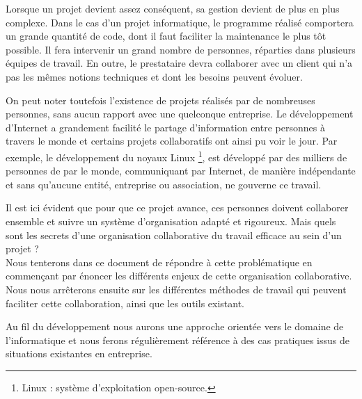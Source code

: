 
Lorsque un projet devient assez conséquent, sa gestion devient de plus en plus complexe. Dans le cas d'un projet informatique, le programme réalisé comportera un grande quantité de code, dont il faut faciliter la maintenance le plus tôt possible. Il fera intervenir un grand nombre de personnes, réparties dans plusieurs équipes de travail. En outre, le prestataire devra collaborer avec un client qui n'a pas les mêmes notions techniques et dont les besoins peuvent évoluer.

On peut noter toutefois l'existence de projets réalisés par de nombreuses personnes, sans aucun rapport avec une quelconque entreprise. Le développement d'Internet a grandement facilité le partage d'information entre personnes à travers le monde et certains projets collaboratifs ont ainsi pu voir le jour. Par exemple, le développement du noyaux Linux \footnote{Linux : système d'exploitation open-source.}, est développé par des milliers de personnes de par le monde, communiquant par Internet, de manière indépendante et sans qu'aucune entité, entreprise ou association, ne gouverne ce travail.

Il est ici évident que pour que ce projet avance, ces personnes doivent collaborer ensemble et suivre un système d'organisation adapté et rigoureux. Mais quels sont les secrets d'une organisation collaborative du travail efficace au sein d'un projet ?\\

Nous tenterons dans ce document de répondre à cette problématique en commençant par énoncer les différents enjeux de cette organisation collaborative. Nous nous arrêterons ensuite sur les différentes méthodes de travail qui peuvent faciliter cette collaboration, ainsi que les outils existant.

Au fil du développement nous aurons une approche orientée vers le domaine de l'informatique et nous ferons régulièrement référence à des cas pratiques issus de situations existantes en entreprise.
